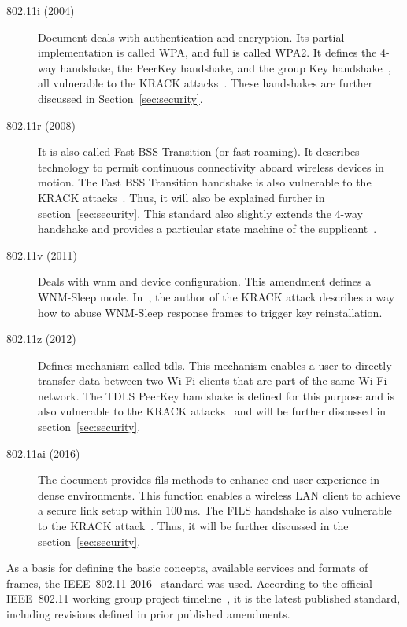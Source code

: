 \begin{description}
\item [802.11i (2004)] Document deals with authentication and encryption. Its partial implementation is called WPA, and full is called WPA2. It defines the 4-way handshake, the PeerKey handshake, and the group Key handshake~\cite{ieee802.11i_2004}, all vulnerable to the KRACK attacks~\cite{VA17}. These handshakes are further discussed in Section~\ref{sec:security}.

\item [802.11r (2008)] It is also called Fast BSS Transition (or fast roaming). It describes technology to permit continuous connectivity aboard wireless devices in motion. The Fast BSS Transition handshake is also vulnerable to the KRACK attacks~\cite{VA17}. Thus, it will also be explained further in section~\ref{sec:security}. This standard also slightly extends the 4-way handshake and provides a particular state machine of the supplicant~\cite{ieee802.11r_2008}.

\item[802.11v (2011)] Deals with \gls{wnm} and device configuration. This amendment defines a WNM-Sleep mode. In~\cite{VA_ccs2018}, the author of the KRACK attack describes a way how to abuse WNM-Sleep response frames to trigger key reinstallation. 

\item[802.11z (2012)] Defines mechanism called \gls{tdls}. This mechanism enables a user to directly transfer data between two Wi-Fi clients that are part of the same Wi-Fi network. The TDLS PeerKey handshake is defined for this purpose and is also vulnerable to the KRACK attacks~\cite{VA_ccs2018} and will be further discussed in section~\ref{sec:security}.

\item[802.11ai (2016)] The document provides \gls{fils} methods to enhance end-user experience in dense environments. This function enables a wireless LAN client to achieve a secure link setup within 100\,ms. The FILS handshake is also vulnerable to the KRACK attack~\cite{VA_ccs2018}. Thus, it will be further discussed in the section~\ref{sec:security}.
\end{description}

As a basis for defining the basic concepts, available services and formats of frames, the IEEE~802.11-2016~\cite{revision2016} standard was used. According to the official IEEE~802.11 working group project timeline~\cite{ie18_timeline}, it is the latest published standard, including revisions defined in prior published amendments.

